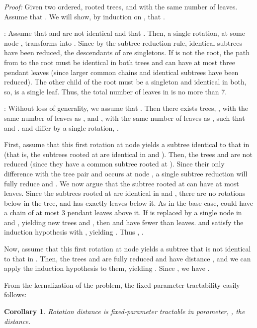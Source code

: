 \documentclass[12pt]{article}
\newtheorem{corollary}[theorem]{Corollary}
\begin{document}
{\em Proof:}
Given two ordered, rooted trees,  and 
with the same number of leaves.  Assume 
that .  
We will show, by induction on , that .

:  Assume that  and  are not 
identical and that .  Then, a single
rotation, at some node , transforms  into .
Since by the subtree reduction rule, identical subtrees
have been reduced, the descendants of  are 
singletons.  If  is not the root, the path from  to
the root must be identical in both trees and can have
at most three pendant leaves (since larger common 
chains and identical subtrees have been reduced).
The other child of the root must be a singleton and 
identical in both, so, is a single leaf.   Thus, the total 
number of leaves in  is no more than 7.

:  Without loss of generality, we assume that 
.
Then there exists trees, , with the same number of
leaves as , and , with the same number of
leaves as , such that 
 and .
 and  differ by a single rotation, .  

First, assume that this first rotation at node  yields
a subtree identical to that in  (that is, the subtrees 
rooted at  are identical in  and ).  Then, 
the trees  and  are not reduced (since they
have a common subtree rooted at ).  Since their
only difference with the tree pair   and 
occurs at node , a single subtree reduction will 
fully reduce  and .  We now argue that the 
subtree rooted at  can have at most  leaves.
Since the subtrees rooted at  are identical in 
and , there are no rotations below  in the
tree, and  has exactly  leaves below it.  
As in the base case, 
could have a chain of at most 3 pendant leaves above
it.  If  is replaced by a single node in  and , 
yielding new trees  and , then  and 
have fewer than  leaves.   and 
satisfy the induction hypothesis with
, yielding .
Thus , .

Now, assume that this first rotation at node  yields
a subtree that is not identical to that in .  Then,
the trees  and  are fully reduced and have
distance , and we can
apply the induction hypothesis to them, yielding 
.  Since , we have
.
\hfill 

From the kernalization of the problem, the fixed-parameter
tractability easily follows:

\begin{corollary} 
\label{mainthm} Rotation distance is fixed-parameter
tractable in parameter, , the distance.
\end{corollary}
\end{document}

